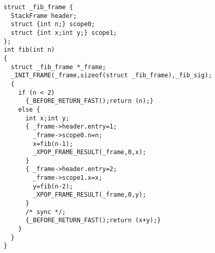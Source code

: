 \begin{verbatim}
struct _fib_frame {
  StackFrame header;
  struct {int n;} scope0;
  struct {int x;int y;} scope1;
};
int fib(int n)
{
  struct _fib_frame *_frame;
  _INIT_FRAME(_frame,sizeof(struct _fib_frame),_fib_sig);
  {
    if (n < 2) 
      {_BEFORE_RETURN_FAST();return (n);}
    else {
      int x;int y;
      { _frame->header.entry=1;
        _frame->scope0.n=n;
        x=fib(n-1);
        _XPOP_FRAME_RESULT(_frame,0,x);
      }
      { _frame->header.entry=2;
        _frame->scope1.x=x;
        y=fib(n-2);
        _XPOP_FRAME_RESULT(_frame,0,y);
      }
      /* sync */;
      {_BEFORE_RETURN_FAST();return (x+y);}
    }
  }
}
\end{verbatim}
